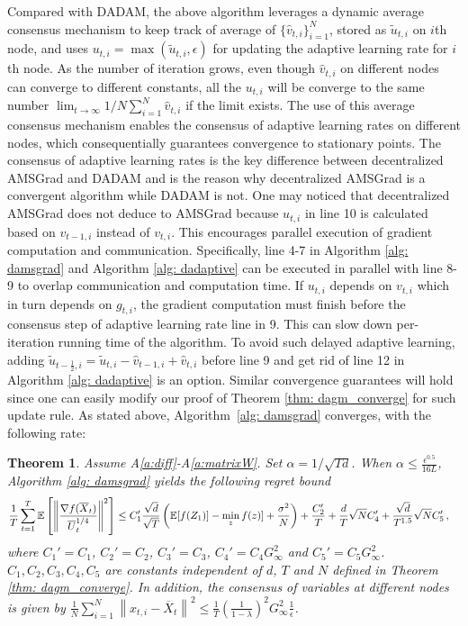 \documentclass{article} %
\newtheorem{theorem}{Theorem}
\begin{document}
Compared with DADAM, the above algorithm leverages a dynamic average consensus mechanism to keep track of average of $\{\hat v_{t,i}\}_{i=1}^N$, stored as $\tilde u_{t,i}$ on $i$th node, and uses $u_{t,i} = \max(\tilde u_{t,i}, \epsilon)$ for updating the adaptive learning rate for $i$th node. As the number of iteration grows, even though $\hat v_{t,i}$ on different nodes can converge to different constants, all the $u_{t,i}$ will be converge to the same number $ \lim_{t \rightarrow \infty} 1/N \sum_{i=1}^N\hat v_{t,i} $ if the limit exists.
The use of this average consensus mechanism enables the consensus of adaptive learning rates on different nodes, which consequentially guarantees convergence to stationary points. 
The consensus of adaptive learning rates is the key difference between decentralized AMSGrad and DADAM and is the reason why decentralized AMSGrad is a convergent algorithm while DADAM is not.
One may noticed that decentralized AMSGrad does not deduce to AMSGrad because $u_{t,i}$ in line 10 is calculated based on $v_{t-1,i}$ instead of $v_{t,i}$.
This encourages parallel execution of gradient computation and communication. 
Specifically, line 4-7 in Algorithm \ref{alg: damsgrad} and Algorithm \ref{alg: dadaptive} can be executed in parallel with line 8-9 to overlap communication and computation time. 
If $u_{t,i}$ depends on $v_{t,i}$ which in turn depends on $g_{t,i}$, the gradient computation must finish before the consensus step of adaptive learning rate line in 9. 
This can slow down per-iteration running time of the algorithm. 
To avoid such delayed adaptive learning, adding $\tilde u_{t-\frac{1}{2},i} = \tilde u_{t,i} - \hat v_{t-1,i} + \hat v_{t,i}$ before line 9 and get rid of line 12 in Algorithm \ref{alg: dadaptive} is an option.
Similar convergence guarantees will hold since one can easily modify our proof of Theorem \ref{thm: dagm_converge} for such update rule. As stated above, Algorithm~\ref{alg: damsgrad} converges, with the following rate:
\begin{theorem}\label{thm: dams_converge}
Assume A\ref{a:diff}-A\ref{a:matrixW}.
Set $\alpha = 1/\sqrt{Td}$. When $\alpha  \leq \frac{\epsilon^{0.5}}{16L} $, Algorithm \ref{alg: damsgrad} yields the following regret bound
{\small 
	  \begin{align}\notag
	  & \frac{1}{T}\sum_{t=1}^T  \mathbb E \left [\left\|\frac{\nabla f( \overline X_{t})}{\overline U_{t}^{1/4}}\right\|^2  \right] 
	  \leq    C_1' \frac{\sqrt{d}}{\sqrt{T}} \left(\mathbb E  [f( Z_{1})]  - \min_{z} f(z)]  + \frac{\sigma^2}{N}\right)  +  \frac{ C_2'}{T}    +   \frac{d}{T }\sqrt{N} C_4' + \frac{\sqrt{d}}{T^{1.5} } \sqrt{N} C_5'\, ,
	  \end{align}
	  }%
	where $C_1' = C_1$, $C_2' = C_2$, $C_3' = C_3$, $C_4' = C_4G_{\infty}^2$ and $C_5' = C_5 G_{\infty}^2 $. $C_1,C_2, C_3, C_4, C_5$ are constants independent of $d$, $T$ and $N$ defined in Theorem \ref{thm: dagm_converge}. In addition, the consensus of variables at different nodes is given by $\frac{1}{N}\sum_{i=1}^N\left\| {  x_{t,i} -   \overline X_{t}}  \right\|^2   \leq \frac{1}{T} \left (\frac{1}{1-\lambda} \right)^2  G_{\infty}^2 \frac{1}{\epsilon}$. 
\end{theorem}
\end{document}
